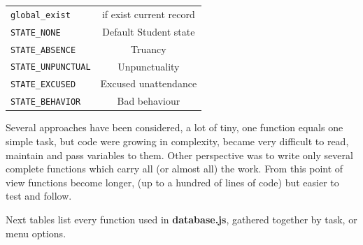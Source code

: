 \begin{shadowblock}{13cm}
\begin{tabular}{lc}
\texttt{global\_exist } & if exist current record\\

\texttt{STATE\_NONE  }& Default Student state\\
\texttt{STATE\_ABSENCE} & Truancy \\
\texttt{STATE\_UNPUNCTUAL}  & Unpunctuality \\
\texttt{STATE\_EXCUSED} & Excused unattendance  \\
\texttt{STATE\_BEHAVIOR } &  Bad behaviour \\

\end{tabular}
\end{shadowblock}

Several approaches have been considered, a lot of tiny, one function equals one simple task, but code were 
growing in complexity, became very difficult to read, maintain and pass variables to them. Other perspective was to write 
only several complete functions which carry all (or almost all) the work. From this point of view functions become longer, 
(up to a hundred of lines of code) but easier to test and follow.

Next tables list every function used in {\bf database.js}, gathered together by task, or menu options.

